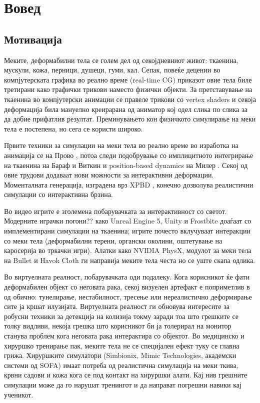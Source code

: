 \newpage
{}
\setcounter{page}{1}

\chapter{Вовед}
\section{Мотивација}
Меките, деформабилни тела се голем дел од секојдневниот живот: ткаенина, мускули, кожа, перници, душеци, гуми, кал. Сепак, повеќе децении во компјутерската графика во реално време (real-time CG) приказот овие тела биле третирани како графички трикови наместо физички објекти. За претставување на ткаенина во компјутерски анимации се правеле трикови со vertex shaders и секоја деформација била мануелно креирарана од аниматор кој одел слика по слика за да добие прифатлив резултат. Преминувањето кон физичкото симулирање на меки тела е постепена, но сега се користи широко.

Првите техники за симулации на меки тела во реално време во изработка на анимација се на Прово \cite{Provot1995DeformationCI}, потоа следи подобрување со имплицитното интегрирање на ткаенина на Бараф и Виткин \cite{BaraffDavidWitkin1998} и position-based dynamics на Милер \cite{pbd}. Секој од овие трудови додаваат нови можности за интерактивни деформации. Моменталната генерација, изградена врз XPBD \cite{macklin2016xpbd}, конечно дозволува реалистични симулации со интерактивна брзина. 

Во видео игрите е зголемена побарувачката за интерактивност со светот. Модерните играчки погони?? како Unreal Engine 5, Unity и Frostbite доаѓаат со имплементирани симулации на ткаенина; игрите почесто вклучуваат интеракции со меки тела (деформабилни терени, органски околини, оштетување на каросерија во тркачки игри). Алатки како NVIDIA PhysX, модулот за меки тела на Bullet и Havok Cloth ги направија меките тела честа но се уште скапа одлика.

Во виртуелната реалност, побарувачката оди подалеку. Кога корисникот ќе фати деформабилен објект со неговата рака, секој визуелен артефакт е поприметлив в од обично: тунелирање, нестабилност, тресење или нереалистично деформирање сите ја кршат илузијата. Виртуелната реалност ги обновува интересите за робусни техники за детекција на колизија токму заради тоа што грешките се толку видливи, некоја грешка што корисникот би ја толерирал на монитор станува проблем кога неговата рака интерактира со објектот. Во медицинско и хируршко тренирање пак, меките тела не се специјален ефект туку се главна грижа. Хируршките симулатори (Simbionix, Mimic Technologies, академски системи од SOFA) имаат потреба од реалистична симулација на меки ткива, крвни садови и кожа кога се под контакт на хируршки алати. Кај нив грешните симулации може да го нарушат тренингот и да направат погрешни навики кај ученикот. 

